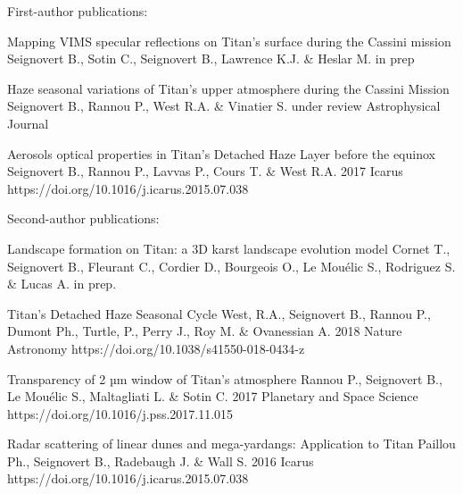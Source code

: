 
\begin{cvpublications}{First-author publications:}

	{Mapping VIMS specular reflections on Titan's surface during the Cassini mission}
	{Seignovert B., Sotin C., Seignovert B., Lawrence K.J. \& Heslar M.}
	{in prep}
    {}
    {}

	{Haze seasonal variations of Titan's upper atmosphere during the Cassini Mission}
	{Seignovert B., Rannou P., West R.A. \& Vinatier S.}
	{under review}
    {Astrophysical Journal}
    {}

	{Aerosols optical properties in Titan's Detached Haze Layer before the equinox}
	{Seignovert B., Rannou P., Lavvas P., Cours T. \& West R.A.}
	{2017}
	{Icarus}
	{https://doi.org/10.1016/j.icarus.2015.07.038}

\end{cvpublications}

\begin{cvpublications}{Second-author publications:}

	{Landscape formation on Titan: a 3D karst landscape evolution model}
	{Cornet T., Seignovert B., Fleurant C., Cordier D., Bourgeois O., Le Mouélic S., Rodriguez S. \& Lucas A.}
	{in prep.}
    {}
    {}

	{Titan's Detached Haze Seasonal Cycle}
	{West, R.A., Seignovert B., Rannou P., Dumont Ph., Turtle,  P., Perry J., Roy M. \& Ovanessian A.}
	{2018}
    {Nature Astronomy}
    {https://doi.org/10.1038/s41550-018-0434-z}

	{Transparency of 2 µm window of Titan’s atmosphere}
	{Rannou P., Seignovert B., Le Mouélic S., Maltagliati L. \& Sotin C.}
	{2017}
	{Planetary and Space Science}
	{https://doi.org/10.1016/j.pss.2017.11.015}

	{Radar scattering of linear dunes and mega-yardangs: Application to Titan}
	{Paillou Ph., Seignovert B., Radebaugh J. \& Wall S.}
	{2016}
	{Icarus}
	{https://doi.org/10.1016/j.icarus.2015.07.038}

\end{cvpublications}

